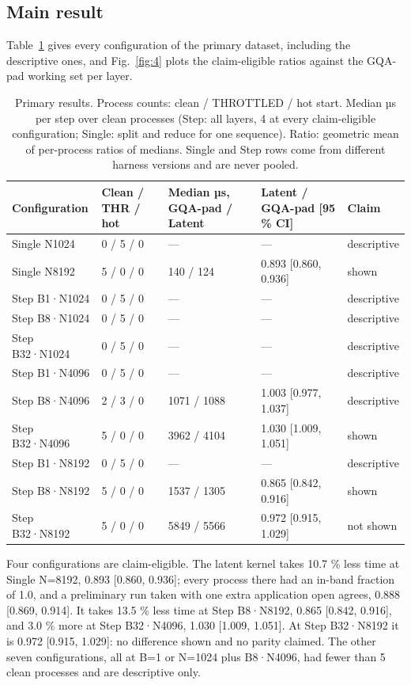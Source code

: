 \documentclass[conference]{IEEEtran}
\begin{document}
\subsection{Main result}

Table~\ref{tab:4} gives every configuration of the primary dataset, including the descriptive ones, and Fig.~\ref{fig:4} plots the claim-eligible ratios against the GQA-pad working set per layer.

\begin{table}[t]
\centering
\caption{Primary results. Process counts: clean / THROTTLED / hot start. Median µs per step over clean processes (Step: all layers, 4 at every claim-eligible configuration; Single: split and reduce for one sequence). Ratio: geometric mean of per-process ratios of medians. Single and Step rows come from different harness versions and are never pooled.}\label{tab:4}
\begin{tabular}{lllll}
\toprule
Configuration & Clean / THR / hot & Median µs, GQA-pad / Latent & Latent / GQA-pad {[}95 \% CI{]} & Claim \\
\midrule
Single N1024 & 0 / 5 / 0 & --- & --- & descriptive \\
Single N8192 & 5 / 0 / 0 & 140 / 124 & 0.893 {[}0.860, 0.936{]} & shown \\
Step B1·N1024 & 0 / 5 / 0 & --- & --- & descriptive \\
Step B8·N1024 & 0 / 5 / 0 & --- & --- & descriptive \\
Step B32·N1024 & 0 / 5 / 0 & --- & --- & descriptive \\
Step B1·N4096 & 0 / 5 / 0 & --- & --- & descriptive \\
Step B8·N4096 & 2 / 3 / 0 & 1071 / 1088 & 1.003 {[}0.977, 1.037{]} & descriptive \\
Step B32·N4096 & 5 / 0 / 0 & 3962 / 4104 & 1.030 {[}1.009, 1.051{]} & shown \\
Step B1·N8192 & 0 / 5 / 0 & --- & --- & descriptive \\
Step B8·N8192 & 5 / 0 / 0 & 1537 / 1305 & 0.865 {[}0.842, 0.916{]} & shown \\
Step B32·N8192 & 5 / 0 / 0 & 5849 / 5566 & 0.972 {[}0.915, 1.029{]} & not shown \\
\bottomrule
\end{tabular}
\end{table}

Four configurations are claim-eligible. The latent kernel takes 10.7 \% less time at Single N=8192, 0.893 {[}0.860, 0.936{]}; every process there had an in-band fraction of 1.0, and a preliminary run taken with one extra application open agrees, 0.888 {[}0.869, 0.914{]}. It takes 13.5 \% less time at Step B8·N8192, 0.865 {[}0.842, 0.916{]}, and 3.0 \% more at Step B32·N4096, 1.030 {[}1.009, 1.051{]}. At Step B32·N8192 it is 0.972 {[}0.915, 1.029{]}: no difference shown and no parity claimed. The other seven configurations, all at B=1 or N=1024 plus B8·N4096, had fewer than 5 clean processes and are descriptive only.
\end{document}
